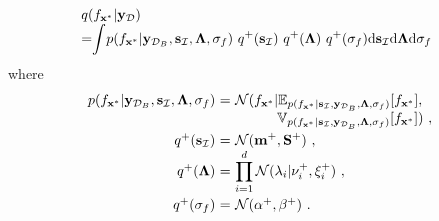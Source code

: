\documentclass[conference]{IEEEtran}
\begin{document}
	\begin{equation*}
	\hspace{-1.7mm}
	\begin{array}{l}
		q(f_{\mathbf{x}^*}|\mathbf{y}_\mathcal{D})\\
		\displaystyle=\hspace{-1mm}\int\hspace{-0.5mm} p(f_{\mathbf{x}^*}|\mathbf{y}_{\mathcal{D}_B}, \mathbf{s}_\mathcal{I},\mathbf{\Lambda},\sigma_f)\ q^+(\mathbf{s}_\mathcal{I})\ q^+(\mathbf{\Lambda})\ q^+(\sigma_f)\mathrm{d}\mathbf{s}_\mathcal{I}\mathrm{d}\mathbf{\Lambda}\mathrm{d}\sigma_f
	\end{array}
	\end{equation*}
	where
	\begin{equation*}
		\begin{array}{rcl}
			p(f_{\mathbf{x}^*}|\mathbf{y}_{\mathcal{D}_B}, \mathbf{s}_\mathcal{I},\mathbf{\Lambda},\sigma_f)&\hspace{-2.4mm}=&\hspace{-2.4mm}\displaystyle\mathcal{N}(f_{\mathbf{x}^*}|\mathbb{E}_{p(f_{\mathbf{x}^*}|\mathbf{s}_\mathcal{I},\mathbf{y}_{\mathcal{D}_B},\mathbf{\Lambda},\sigma_f)}[f_{\mathbf{x}^*}],\\
			&&\hspace{-2.4mm}\qquad\quad\mathbb{V}_{p(f_{\mathbf{x}^*}|\mathbf{s}_\mathcal{I},\mathbf{y}_{\mathcal{D}_B},\mathbf{\Lambda},\sigma_f)}[f_{\mathbf{x}^*}]) \ ,\vspace{1mm}\\
			q^+(\mathbf{s}_\mathcal{I})&\hspace{-2.4mm}=&\hspace{-2.4mm}\displaystyle\mathcal{N}(\mathbf{m}^+,\mathbf{S}^+)\ , \\
			q^+(\mathbf{\Lambda})&\hspace{-2.4mm}=&\hspace{-2.4mm}\displaystyle\prod_{i=1}^{d}\mathcal{N}(\lambda_i|\nu_i^+,\xi_i^+)\ , \vspace{1mm}\\
			q^+(\sigma_f)&\hspace{-2.4mm}=&\hspace{-2.4mm}\mathcal{N}(\alpha^+,\beta^+)\ .	
		\end{array}
	\end{equation*}
\end{document}
